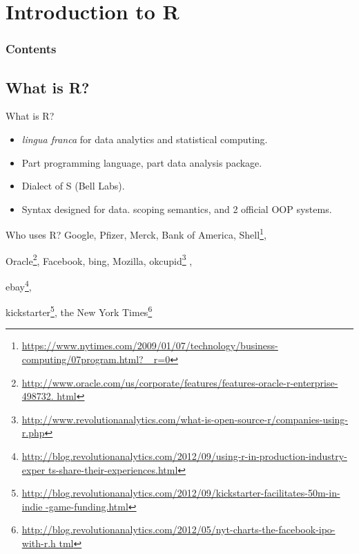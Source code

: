 \section{Introduction to R}

\hidenum
\begin{frame}[noframenumbering]
\frametitle{Contents}
 \tableofcontents[currentsection,hideothersubsections,sectionstyle=show/hide]
\end{frame}
\shownum



\subsection{What is R?}

\begin{frame}
  \begin{block}{What is R?}\pause
  \begin{itemize}[<+-|alert@+>]
    \item \emph{lingua franca} for data analytics and statistical computing.
    \item Part programming language, part data analysis package.
    \item Dialect of S (Bell Labs).
    \item Syntax designed for data.
scoping semantics, and 2 official OOP systems.
  \end{itemize}
\end{block}
\end{frame}

\begin{frame}
  \begin{block}{Who uses R?}\pause
   Google, Pfizer, Merck, Bank of America, 
Shell\footnote{\url{
https://www.nytimes.com/2009/01/07/technology/business-computing/07program.html?
_r=0}}, 
   
Oracle\footnote{\url{
http://www.oracle.com/us/corporate/features/features-oracle-r-enterprise-498732.
html}},
   Facebook, bing, Mozilla, 
okcupid\footnote{\url{
http://www.revolutionanalytics.com/what-is-open-source-r/companies-using-r.php}}
,
   
ebay\footnote{\url{
http://blog.revolutionanalytics.com/2012/09/using-r-in-production-industry-exper
ts-share-their-experiences.html}},
   
kickstarter\footnote{\url{
http://blog.revolutionanalytics.com/2012/09/kickstarter-facilitates-50m-in-indie
-game-funding.html}},
   the New York 
Times\footnote{\url{
http://blog.revolutionanalytics.com/2012/05/nyt-charts-the-facebook-ipo-with-r.h
tml}}
  \end{block}
\end{frame}

